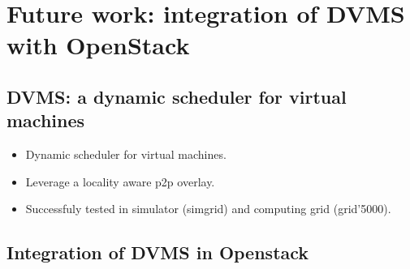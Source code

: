 \section{Future work: integration of DVMS with OpenStack}
\label{sec:future_work}

\subsection{DVMS: a dynamic scheduler for virtual machines}

\begin{itemize}

	\item Dynamic scheduler for virtual machines.

	\item Leverage a locality aware p2p overlay.

	\item Successfuly tested in simulator (simgrid) and computing grid (grid'5000).

\end{itemize}


\subsection{Integration of DVMS in Openstack}

